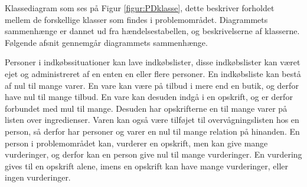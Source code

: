Klassediagram som ses på Figur \ref{figur:PDklasse}, dette beskriver forholdet mellem de forskellige klasser som findes i problemområdet. Diagrammets sammenhænge er dannet ud fra hændelsestabellen, og beskrivelserne af klasserne. Følgende afsnit gennemgår diagrammets sammenhænge.

Personer i indkøbssituationer kan lave indkøbslister, disse indkøbslister kan været ejet og administreret af en enten en eller flere personer.
En indkøbsliste kan bestå af nul til mange varer.
En vare kan være på tilbud i mere end en butik, og derfor have nul til mange tilbud.
En vare kan desuden indgå i en opskrift, og er derfor forbundet med mul til mange.
Desuden har opskrifterne en til mange varer på listen over ingredienser.
Varen kan også være tilføjet til overvågningslisten hos en person, så derfor har personer og varer en nul til mange relation på hinanden.
En person i problemområdet kan, vurderer en opskrift, men kan give mange vurderinger, og derfor kan en person give nul til mange vurderinger. 
En vurdering gives til en opskrift alene, imens en opskrift kan have mange vurderinger, eller ingen vurderinger.
